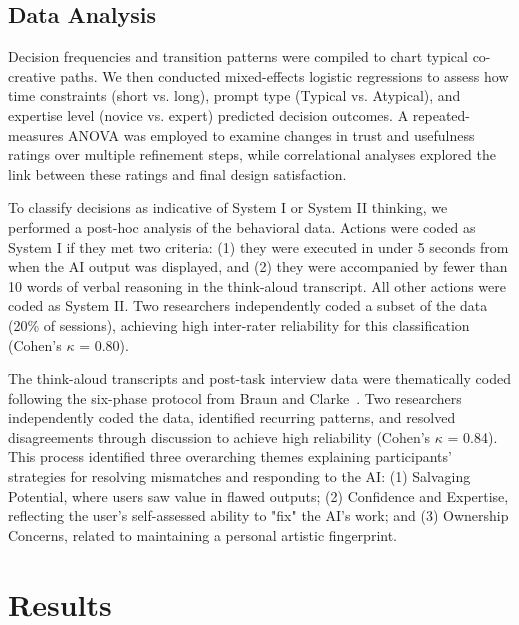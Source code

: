 \documentclass[letterpaper]{article} %
\begin{document}
\subsection{Data Analysis}
Decision frequencies and transition patterns were compiled to chart typical co-creative paths. We then conducted mixed-effects logistic regressions to assess how time constraints (short vs. long), prompt type (Typical vs. Atypical), and expertise level (novice vs. expert) predicted decision outcomes. A repeated-measures ANOVA was employed to examine changes in trust and usefulness ratings over multiple refinement steps, while correlational analyses explored the link between these ratings and final design satisfaction.

To classify decisions as indicative of System I or System II thinking, we performed a post-hoc analysis of the behavioral data. Actions were coded as System I if they met two criteria: (1) they were executed in under 5 seconds from when the AI output was displayed, and (2) they were accompanied by fewer than 10 words of verbal reasoning in the think-aloud transcript. All other actions were coded as System II. Two researchers independently coded a subset of the data (20\% of sessions), achieving high inter-rater reliability for this classification (Cohen’s $\kappa$ = 0.80).

The think-aloud transcripts and post-task interview data were thematically coded following the six-phase protocol from Braun and Clarke~\cite{clarke2017thematic}. Two researchers independently coded the data, identified recurring patterns, and resolved disagreements through discussion to achieve high reliability (Cohen’s $\kappa$ = 0.84). This process identified three overarching themes explaining participants' strategies for resolving mismatches and responding to the AI: (1) Salvaging Potential, where users saw value in flawed outputs; (2) Confidence and Expertise, reflecting the user's self-assessed ability to "fix" the AI's work; and (3) Ownership Concerns, related to maintaining a personal artistic fingerprint.



\section{Results}
\end{document}
